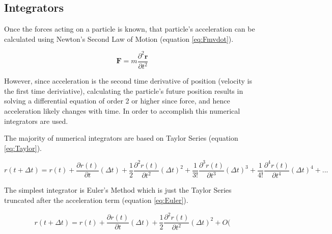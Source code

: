 \documentclass[12pt]{UoAthesis}
\begin{document}
\subsection{Integrators}
Once the forces acting on a particle is known, that particle's
acceleration can be calculated using Newton's Second Law of Motion
(equation \ref{eq:Fmvdot}).

\begin{equation}
  \mathbf{F} =  m \frac{\partial^2 \mathbf{r}}{\partial t^2} \label{eq:Fmvdot}
\end{equation}

However, since acceleration is the second time derivative of position
(velocity is the first time deriviative), calculating the particle's
future position results in solving a differential equation of order 2
or higher since force, and hence acceleration likely changes with
time.  In order to accomplish this numerical integrators are used.

The majority of numerical integrators are based on Taylor Series
(equation \ref{eq:Taylor}).

\begin{equation}
  r(t+\Delta t) = r(t) + \frac{\partial r(t)}{\partial t}(\Delta t) + \frac{1}{2}\frac{\partial^2 r(t)}{\partial t^2}(\Delta t)^2 + \frac{1}{3!}\frac{\partial^3 r(t)}{\partial t^3}(\Delta t)^3 + \frac{1}{4!}\frac{\partial^4 r(t)}{\partial t^4}(\Delta t)^4 + ... \label{eq:Taylor}
\end{equation}

The simplest integrator is Euler's Method which is just the Taylor
Series truncated after the acceleration term (equation
\ref{eq:Euler}).

\begin{equation}
  r(t+\Delta t) = r(t) + \frac{\partial r(t)}{\partial t}(\Delta t) + \frac{1}{2}\frac{\partial^2 r(t)}{\partial t^2}(\Delta t)^2 + O( \label{eq:Euler}
\end{equation}


%
%

\printbibliography[heading=thesisChapterBib]
\end{document}

